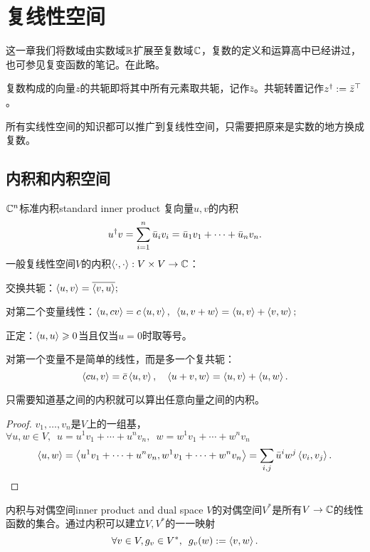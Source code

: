 \chapter{复线性空间}
\label{chap:complex linear space}

这一章我们将数域由实数域$\mathbb R$扩展至复数域$\mathbb C$，复数的定义和运算高中已经讲过，也可参见复变函数的笔记。在此略。

复数构成的向量$z$的共轭即将其中所有元素取共轭，记作$\bar z$。共轭转置记作$z^\dagger:=\bar z^\top$。

所有实线性空间的知识都可以推广到复线性空间，只需要把原来是实数的地方换成复数。
\section{内积和内积空间}
\begin{definition}{$\mathbb C^n$标准内积}{standard inner product}
	复向量$u,v$的内积
	\[
		u^\dagger v=\sum_{i=1}^n\bar u_iv_i=\bar u_1v_1+\cdots+\bar u_nv_n.
	\]
	\tcblower
	一般复线性空间$V$的内积$\left\langle \cdot,\cdot\right\rangle:V\times V\to\mathbb C$：
	\begin{compactitem}
		\item 交换共轭：$\left\langle u,v\right\rangle=\overline{\left\langle v,u\right\rangle};$
		\item 对第二个变量线性：$\left\langle u,cv\right\rangle=c\left\langle u,v\right\rangle,\enspace \left\langle u,v+w\right\rangle=\left\langle u,v\right\rangle+\left\langle v,w\right\rangle;$
		\item 正定：$\left\langle u,u\right\rangle\geqslant 0$当且仅当$u=0$时取等号。
	\end{compactitem}
\end{definition}
\begin{remark}
	对第一个变量不是简单的线性，而是多一个复共轭：
	\[
		\left\langle cu,v\right\rangle=\bar c\left\langle u,v\right\rangle,\quad \left\langle u+v,w\right\rangle=\left\langle u,v\right\rangle+\left\langle u,w\right\rangle.
	\]
\end{remark}
\begin{theorem}{}{}
	只需要知道基之间的内积就可以算出任意向量之间的内积。
\end{theorem}
\begin{proof}
	$v_1,\ldots,v_n$是$V$上的一组基，%
	$\forall u,w\in V,\enspace u=u^1v_1+\cdots+u^nv_n,\enspace w=w^1v_1+\cdots+w^nv_n$
	\[
		\left\langle u,w\right\rangle=\left\langle u^1v_1+\cdots+u^nv_n,w^1v_1+\cdots+w^nv_n\right\rangle=\sum_{i,j}\bar u^iw^j\left\langle v_i,v_j\right\rangle.
		\qedhere
	\]
\end{proof}
\begin{example}{内积与对偶空间}{inner product and dual space}
	$V$的对偶空间$V^\ast$是所有$V\to\mathbb C$的线性函数的集合。通过内积可以建立$V,V^\ast$的一一映射
	\[
		\forall v\in V,g_v\in V^\ast,\enspace g_v(w):=\left\langle v,w\right\rangle
.	\]
\end{example}
